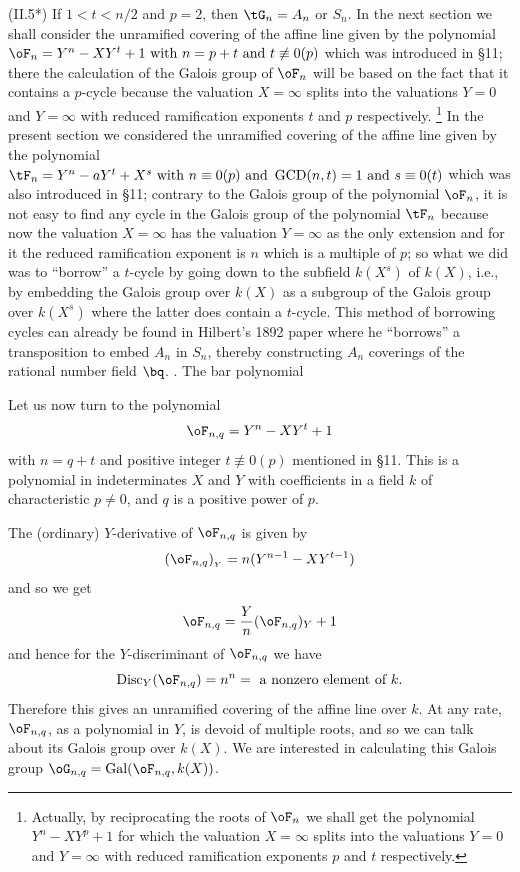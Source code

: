 (II.5*) If $1<t<n/2$ and $p=2$, then $\tG_n=A_n$ or $S_n$.
{}
In the next section we shall consider the unramified 
covering
of the affine line given by the polynomial
$\oF_n=Y^n-XY^t+1\text{ with }n=p+t\text{ and }t\not\equiv 
0(p)$ which was
introduced in \S11; there the calculation of the Galois 
group of $\oF_n$
will be based on the fact that it contains a $p$-cycle 
because the
valuation $X=\infty$ splits into the valuations $Y=0$ and 
$Y=\infty$
with reduced ramification exponents $t$ and $p$ 
respectively. 
\footnote{Actually, by reciprocating the roots of $\oF_n$ 
we shall
get the polynomial $Y^n-XY^p+1$ for which the valuation 
$X=\infty$ splits
into the valuations $Y=0$ and $Y=\infty$ with reduced 
ramification
exponents $p$ and $t$ respectively.}
In the present section we considered the unramified covering
of the affine line given by the polynomial
$\tF_n=Y^n-aY^t+X^s\text{ with }n\equiv 0(p)\text{ and 
}\operatorname{GCD}(n,t)=1
\text{ and }s\equiv 0(t)$ which was also introduced in 
\S11; 
contrary to the Galois group of the  polynomial $\oF_n$,
it is not easy to find any cycle in the Galois group of the 
polynomial $\tF_n$ because now the valuation $X = \infty$ 
has the
valuation $Y = \infty$ as the only extension  and for it 
the 
reduced ramification exponent is $n$ which is a multiple 
of $p$; so what we
did was to ``borrow'' a $t$-cycle by going down to the 
subfield $k(X^s)$
of $k(X)$, i.e., by embedding the Galois group over $k(X)$ 
as a  subgroup of
the Galois group over $k(X^s)$ where the latter does 
contain a $t$-cycle.
This method of borrowing cycles can already be found in 
Hilbert's 1892
paper \cite{H} 
where he ``borrows'' a transposition to embed $A_n$ in 
$S_n$, thereby
constructing $A_n$ coverings of the rational number field 
$\bq$. 
\endrem 
. The bar polynomial\endheading

Let us now turn to the polynomial
$$
\oF_{n,q}=Y^n-XY^t+1
$$
with $n=q+t$
and positive integer $t\not\equiv 0(p)$
mentioned in \S11. This is a polynomial in indeterminates 
$X$ and $Y$ 
with coefficients in a field $k$ of characteristic $p\ne 
0$, and $q$ is a 
positive power of $p$.

The (ordinary) $Y$-derivative of $\oF_{n,q}$ is given by
$$
(\oF_{n,q})_{_Y}=n(Y^{n-1}-XY^{t-1})
$$
and so we get 
$$
\oF_{n,q}=\frac Yn (\oF_{n,q})_Y+1
$$ 
and hence for the $Y$-discriminant of $\oF_{n,q}$ we have
$$
\text{Disc}_Y(\oF_{n,q})=n^n=\text{ a nonzero element of }k.
$$
Therefore this gives an unramified covering of the affine 
line over $k$.
At any rate, $\oF_{n,q}$, as a polynomial in $Y$, is 
devoid of multiple
roots, and so we can talk about its Galois group over 
$k(X)$. We are
interested in calculating this Galois group 
$\oG_{n,q}=\operatorname{Gal}(\oF_{n,q},k(X))$.

